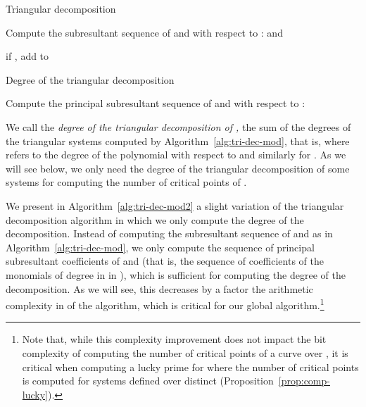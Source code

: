 \documentclass{sig-alternate}
\begin{document}
\begin{algorithm}[t]
  \caption{Triangular decomposition \cite{VegKah:curve2d:96,Li-modpn-11}} 
\label{alg:tri-dec-mod}
\begin{algorithmic}[1]
\STATE Compute the subresultant sequence of  and  with respect to : 
\STATE   and  \label{line2-algo1}
\FOR { \TO }
\STATE  \label{line4-algo1}

\STATE  \label{line5-algo1}
\STATE if , add  to  
\ENDFOR
\RETURN 
\end{algorithmic}
\end{algorithm}



\begin{algorithm}[t]
  \caption{Degree of the triangular decomposition } 
\label{alg:tri-dec-mod2}
\begin{algorithmic}[1]
\STATE Compute the principal subresultant sequence of  and  with respect to : 
\STATE   
\FOR { \TO }
\STATE \label{line4-algo2}

\ENDFOR
\RETURN 
\end{algorithmic}
\end{algorithm}



\smallskip
{}\quad
We call the \emph{degree of the triangular decomposition of ,} 
the sum of the degrees of the triangular systems computed
by Algorithm~\ref{alg:tri-dec-mod}, that is,
 where  refers to the degree of the
polynomial with respect to  and similarly for .
As we will see below, we only need the degree of the  triangular decomposition of some systems for computing the
number of critical points of . 

We present in Algorithm~\ref{alg:tri-dec-mod2}  a slight variation of the triangular
decomposition algorithm in which we only compute the degree of the decomposition. 
Instead of computing the subresultant sequence  of
 and  as in Algorithm~\ref{alg:tri-dec-mod}, we only compute  the sequence of principal
subresultant coefficients of
 and  (that is, the sequence of coefficients of the monomials of degree  in  in
), which is sufficient for computing the degree of the decomposition. As we will
see, this decreases by a factor   the arithmetic complexity in  of the algorithm, which is
critical for our global algorithm.\footnote{\small Note that, while  this complexity improvement does not
impact the bit complexity of computing the number of critical points of a curve  over , it is
critical when computing a lucky prime for  where the number
of critical points is computed for  systems defined over distinct    (Proposition~\ref{prop:comp-lucky}).}
\end{document}
